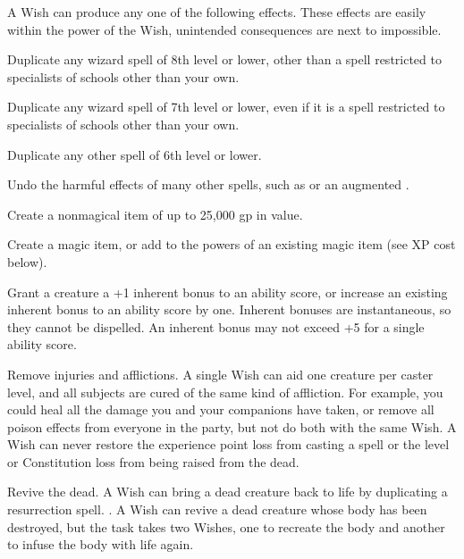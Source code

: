 A Wish can produce any one of the following effects. 
These effects are easily within the power of the Wish, unintended consequences are next to impossible.
\begin{list}{}{\leftmargin=1em}
  \item Duplicate any wizard spell of 8th level or lower, other than a spell restricted to specialists of schools other than your own.
  \item Duplicate any wizard spell of 7th level or lower, even if it is a spell restricted to specialists of schools other than your own.
  \item Duplicate any other spell of 6th level or lower.
  \item Undo the harmful effects of many other spells, such as  or an augmented .
  \item Create a nonmagical item of up to 25,000 gp in value.
  \item Create a magic item, or add to the powers of an existing magic item (see XP cost below).
  \item Grant a creature a +1 inherent bonus to an ability score, or increase an existing inherent bonus to an ability score by one.
  Inherent bonuses are instantaneous, so they cannot be dispelled. An inherent bonus may not exceed +5 for a single ability score.
  \item Remove injuries and afflictions. A single Wish can aid one creature per caster level, and all subjects are cured of the same kind of affliction. 
  For example, you could heal all the damage you and your companions have taken, or remove all poison effects from everyone in the party, but not do both with the same Wish. 
  A Wish can never restore the experience point loss from casting a spell or the level or Constitution loss from being raised from the dead.
  \item Revive the dead. A Wish can bring a dead creature back to life by duplicating a resurrection spell. .
  A Wish can revive a dead creature whose body has been destroyed, but the task takes two Wishes, one to recreate the body and another to infuse the body with life again. 

\end{list}
